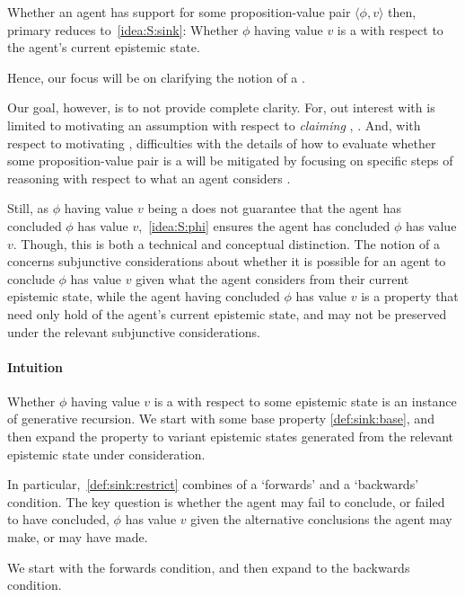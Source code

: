 \begin{note}
  Whether an agent has support for some proposition-value pair \(\langle \phi,v \rangle\) then, primary reduces to~\ref{idea:S:sink}:
  Whether \(\phi\) having value \(v\) is a \sink{} with respect to the agent's current epistemic state.

  Hence, our focus will be on clarifying the notion of a \sink{}.

  Our goal, however, is to not provide complete clarity.
  For, out interest with \support{} is limited to motivating an assumption with respect to \emph{claiming} \support{}, \ideaCS{}.
  And, with respect to motivating \ideaCS{}, difficulties with the details of how to evaluate whether some proposition-value pair is a \sink{} will be mitigated by focusing on specific steps of reasoning with respect to what an agent considers \epVAd{}.

  Still, as \(\phi\) having value \(v\) being a \sink{} does not guarantee that the agent has concluded \(\phi\) has value \(v\),~\ref{idea:S:phi} ensures the agent has concluded \(\phi\) has value \(v\).
  Though, this is both a technical and conceptual distinction.
  The notion of a \sink{} concerns subjunctive considerations about whether it is possible for an agent to conclude \(\phi\) has value \(v\) given what the agent considers \epPAd{} from their current epistemic state, while the agent having concluded \(\phi\) has value \(v\) is a property that need only hold of the agent's current epistemic state, and may not be preserved under the relevant subjunctive considerations.
\end{note}

\paragraph{Intuition}
\label{sec:ideaS:intuition}

\begin{note}[Structure]
  Whether \(\phi\) having value \(v\) is a \sink{} with respect to some epistemic state is an instance of generative recursion.
  We start with some base property \ref{def:sink:base}, and then expand the property to variant epistemic states generated from the relevant epistemic state under consideration.

  In particular,~\ref{def:sink:restrict} combines of a `forwards' and a `backwards' condition.
  The key question is whether the agent may fail to conclude, or failed to have concluded, \(\phi\) has value \(v\) given the alternative conclusions the agent may make, or may have made.

  We start with the forwards condition, and then expand to the backwards condition.
\end{note}

